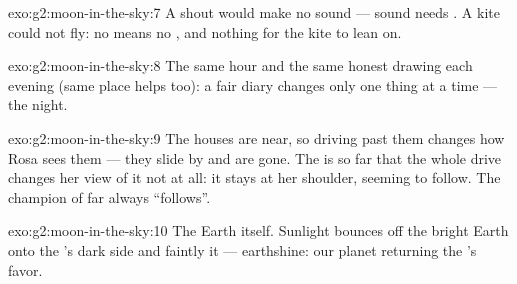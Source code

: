 \begin{solution}{exo:g2:moon-in-the-sky:7}
A shout would make no sound --- sound needs . A kite could not
fly: no  means no , and nothing for the kite to lean on.
\end{solution}

\begin{solution}{exo:g2:moon-in-the-sky:8}
The same hour and the same honest drawing each evening (same place
helps too): a fair diary changes only one thing at a time --- the
night.
\end{solution}

\begin{solution}{exo:g2:moon-in-the-sky:9}
The houses are near, so driving past them changes how Rosa sees them
--- they slide by and are gone. The  is so far that the whole
drive changes her view of it not at all: it stays at her shoulder,
seeming to follow. The champion of far always ``follows''.
\end{solution}

\begin{solution}{exo:g2:moon-in-the-sky:10}
The Earth itself. Sunlight bounces off the bright Earth onto the
's dark side and faintly  it --- earthshine: our planet
returning the 's favor.
\end{solution}

